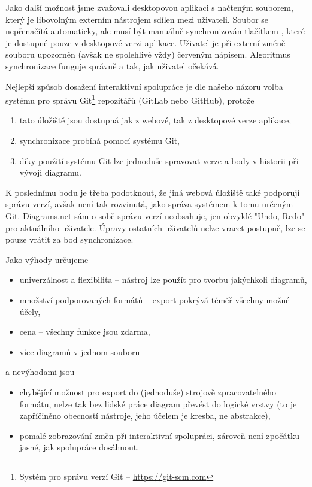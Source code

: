 Jako další možnost jsme zvažovali desktopovou aplikaci s načteným souborem, který je libovolným externím nástrojem sdílen mezi uživateli.
Soubor se nepřenačítá automaticky, ale musí být manuálně synchronizován tlačítkem , které je dostupné pouze v desktopové verzi aplikace.
Uživatel je při externí změně souboru upozorněn (avšak ne spolehlivě vždy) červeným nápisem.
Algoritmus synchronizace funguje správně a tak, jak uživatel očekává.

Nejlepší způsob dosažení interaktivní spolupráce je dle našeho názoru volba systému pro správu Git\footnote{Systém pro správu verzí Git -- \url{https://git-scm.com}} repozitářů (GitLab nebo GitHub), protože
\begin{enumerate}
  \item tato úložiště jsou dostupná jak z webové, tak z desktopové verze aplikace,
  \item synchronizace probíhá pomocí systému Git,
  \item díky použití systému Git lze jednoduše spravovat verze a body v historii při vývoji diagramu.
\end{enumerate}

K poslednímu bodu je třeba podotknout, že jiná webová úložiště také podporují správu verzí, avšak není tak rozvinutá, jako správa systémem k tomu určeným -- Git.
Diagrams.net sám o sobě správu verzí neobsahuje, jen obvyklé "Undo, Redo" pro aktuálního uživatele.
Úpravy ostatních uživatelů nelze vracet postupně, lze se pouze vrátit za bod synchronizace.

Jako výhody určujeme
\begin{itemize}
  \item univerzálnost a flexibilita -- nástroj lze použít pro tvorbu jakýchkoli diagramů,
  \item množství podporovaných formátů -- export pokrývá téměř všechny možné účely,
  \item cena -- všechny funkce jsou zdarma,
  \item více diagramů v jednom souboru
\end{itemize}
a nevýhodami jsou
\begin{itemize}
  \item chybějící možnost pro export do (jednoduše) strojově zpracovatelného formátu, nelze tak bez lidské práce diagram převést do logické vrstvy (to je zapříčiněno obecností nástroje, jeho účelem je kresba, ne abstrakce),
  \item pomalé zobrazování změn při interaktivní spolupráci, zároveň není zpočátku jasné, jak spolupráce dosáhnout.
\end{itemize}

